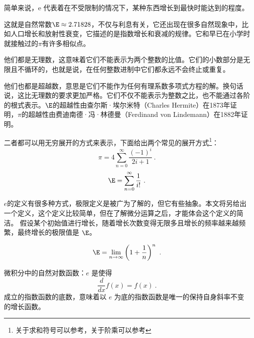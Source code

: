 简单来说，e 代表着在不受限制的情况下，某种东西增长到最快时能达到的程度。

这就是自然常数$\E \approx 2.71828$，不仅与利息有关，它还出现在很多自然现象中，比如人口增长和放射性衰变，它描述的是指数增长和衰减的规律。它和早已在小学时就接触过的$\pi$有许多相似点。

他们都是无理数，这意味着它们不能表示为两个整数的比值。它们的小数部分是无限且不循环的，也就是说，在任何整数进制中它们都永远不会终止或重复。

他们也都是超越数，意思是它们不能作为任何有理系数多项式方程的解。换句话说，这比无理数的要求更加严格。它们不仅不能表示为整数之比，也不能通过各阶的根式表示。$\E$的超越性由查尔斯·埃尔米特（Charles Hermite）在1873年证明，$\pi$的超越性由费迪南德·冯·林德曼（Ferdinand von Lindemann）在1882年证明。

二者都可以用无穷展开的方式来表示，下面给出两个常见的展开方式\footnote{关于求和符号可以参考，关于阶乘可以参考}：
\begin{equation}
\pi=4\sum_{n=0}^\infty\frac{(-1)^i}{2i+1}~.
\end{equation}
\begin{equation}
\E=\sum_{n=0}^\infty\frac{1}{i!}~.
\end{equation}

$e$的定义有很多种方式，极限定义是被广为了解的，但它有些抽象。本文将另给出一个定义，这个定义比较简单，但在了解微分运算之后，才能体会这个定义的简洁。
假设某个初始值进行增长，随着增长次数变得无限多且增长的频率越来越频繁，最终增长的极限值是 $\E$。

\begin{equation}
\E = \lim_{n \to \infty} \left( 1 + \frac{1}{n} \right)^n~.
\end{equation}


微积分中的自然对数函数：$e$ 是使得
\begin{equation}
\frac{d}{dx} f(x) = f(x)~.
\end{equation}
成立的指数函数的底数，意味着以 $e$ 为底的指数函数是唯一的保持自身斜率不变的增长函数。

